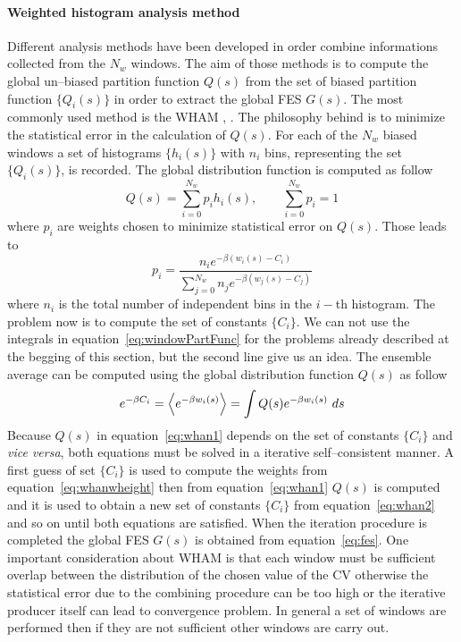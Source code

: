 \paragraph{\textbf{Weighted histogram analysis method}} Different analysis methods have been developed in order combine informations collected from the $N_w$ windows. The aim of those methods is to compute the global un--biased partition function $Q(s)$ from the set of biased partition function $\{Q_i(s)\}$ in order to extract the global \ac{FES} $G(s)$. The most commonly used method is the \ac{WHAM} \cite{WHAM}, \cite{gWHAM}. The philosophy behind is to minimize the statistical error in the calculation of $Q(s)$. For each of the $N_w$ biased windows a set of histograms $\{h_i(s)\}$ with $n_i$ bins, representing the set $\{Q_i(s)\}$, is recorded. The global distribution function is computed as follow
\begin{equation}
	Q(s) = \sum_{i=0}^{N_w} p_i h_i(s), \qquad \sum_{i=0}^{N_w} p_i = 1
	\label{eq:whan1}
\end{equation}
where $p_i$ are weights chosen to minimize statistical error on $Q(s)$. Those leads to
\begin{equation}
	p_i = \frac{n_ie^{-\beta (w_i(s) - C_i)}}{\sum_{j=0}^{N_w} n_je^{-\beta (w_j(s) - C_j)}}
	\label{eq:whanwheight}
\end{equation}
where $n_i$ is the total number of independent bins in the $i-$th histogram. The problem now is to compute the set of constants $\{C_i\}$. We can not use the integrals in equation~\eqref{eq:windowPartFunc} for the problems already described at the begging of this section, but the second line give us an idea. The ensemble average can be computed using the global distribution function $Q(s)$ as follow
\begin{equation}
	e^{-\beta C_i} = \left \langle e^{-\beta w_i(s)} \right \rangle = \int Q(s) e^{-\beta w_i(s)}\ ds
	\label{eq:whan2}
\end{equation} 
Because $Q(s)$ in equation~\eqref{eq:whan1} depends on the set of constants $\{C_i\}$ and \textit{vice versa}, both equations must be solved in a iterative self--consistent manner. A first guess of set $\{C_i\}$ is used to compute the weights from equation~\eqref{eq:whanwheight} then from equation~\eqref{eq:whan1} $Q(s)$ is computed and it is used to obtain a new set of constants $\{C_i\}$ from equation~\eqref{eq:whan2} and so on until both equations are satisfied. When the iteration procedure is completed the global \ac{FES} $G(s)$ is obtained from equation~\eqref{eq:fes}. One important consideration about \ac{WHAM} is that each window must be sufficient overlap between the distribution of the chosen value of the \ac{CV} otherwise the statistical error due to the combining procedure can be too high or the iterative producer itself can lead to convergence problem. In general a set of windows are performed then if they are not sufficient other windows are carry out.

